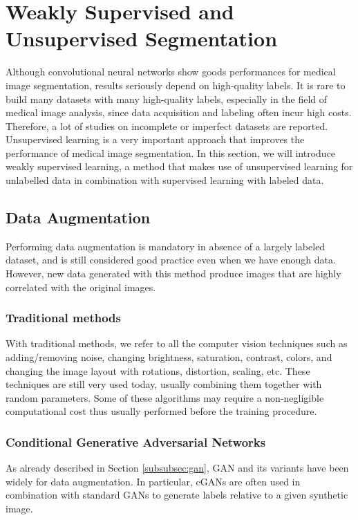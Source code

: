 \section{Weakly Supervised and Unsupervised Segmentation}
Although convolutional neural networks show goods performances for medical
image segmentation, results seriously depend on high-quality
labels. It is rare to build many datasets with many high-quality labels,
especially in the field of medical image analysis, since data acquisition and
labeling often incur high costs. Therefore, a lot of studies on incomplete or
imperfect datasets are reported. Unsupervised learning is a very important approach that improves the performance of medical image segmentation. In this
section, we will introduce weakly supervised learning, a method that makes
use of unsupervised learning for unlabelled data in combination with supervised
learning with labeled data.

\subsection{Data Augmentation}
Performing data augmentation is mandatory in absence of a largely labeled dataset, and is still considered good practice even when we have enough data. However, new data generated with this method produce images that are highly correlated with the original images.

\subsubsection{Traditional methods}
With traditional methods, we refer to all the computer vision techniques such as adding/removing noise, changing brightness, saturation, contrast, colors, and changing the image layout with rotations, distortion, scaling, etc. These techniques are still very used today, usually combining them together with random parameters. Some of these algorithms may require a non-negligible computational cost thus usually performed before the training procedure.

\subsubsection{Conditional Generative Adversarial Networks}
As already described in Section \ref{subsubsec:gan}, GAN and its variants have been widely for data augmentation. In particular, cGANs are often used in combination with standard GANs to generate labels relative to a given synthetic image.

